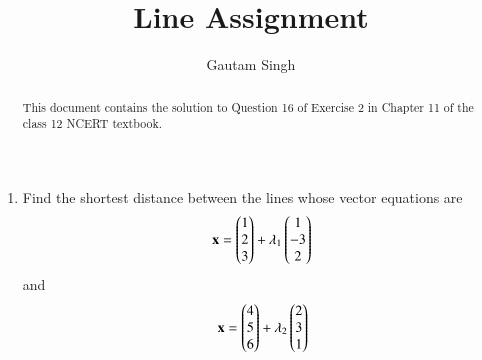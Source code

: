\documentclass[journal,12pt,twocolumn]{IEEEtran}
\renewcommand{\vec}[1]{\boldsymbol{\mathbf{#1}}}
\begin{document}
\vspace{3cm}
\title{Line Assignment}
\author{Gautam Singh}
\maketitle
\bigskip

\begin{abstract}
    This document contains the solution to Question 16 of Exercise 2 in Chapter
    11 of the class 12 NCERT textbook.
\end{abstract}

\begin{enumerate}
    \item Find the shortest distance between the lines whose vector equations are
    \begin{align}
        \vec{x} = \myvec{1\\2\\3} + \lambda_1\myvec{1\\-3\\2}
        \label{eq:L1}
    \end{align}
    and
    \begin{align}
        \vec{x} = \myvec{4\\5\\6} + \lambda_2\myvec{2\\3\\1}
        \label{eq:L2}
    \end{align}


\end{enumerate}
\end{document}
